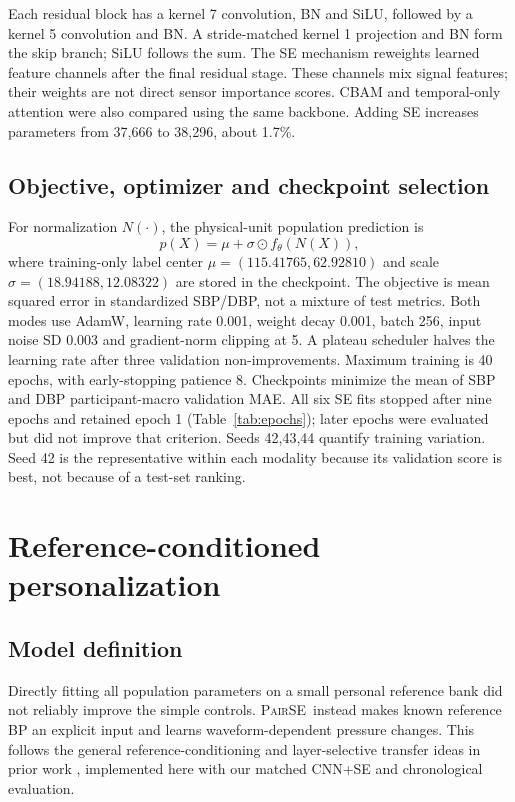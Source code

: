 \documentclass[conference]{IEEEtran}
\newcommand{\pair}{\textsc{PairSE}}
\begin{document}
Each residual block has a kernel 7 convolution, BN and SiLU, followed by a
kernel 5 convolution and BN. A stride-matched kernel 1 projection and BN form
the skip branch; SiLU follows the sum. The SE mechanism \cite{hu2018se}
reweights learned feature channels after the final residual stage. These
channels mix signal features; their weights are not direct sensor importance
scores. CBAM and temporal-only attention were also compared using the same
backbone. Adding SE increases parameters from 37,666 to 38,296, about 1.7\%.

\subsection{Objective, optimizer and checkpoint selection}
For normalization $N(\cdot)$, the physical-unit population prediction is
\begin{equation}
 p(X)=\mu+\sigma\odot f_\theta(N(X)),
\end{equation}
where training-only label center $\mu=(115.41765,62.92810)$ and scale
$\sigma=(18.94188,12.08322)$ are stored in the checkpoint. The objective is
mean squared error in standardized SBP/DBP, not a mixture of test metrics.
Both modes use AdamW, learning rate 0.001, weight decay 0.001, batch 256, input
noise SD 0.003 and gradient-norm clipping at 5. A plateau scheduler halves the
learning rate after three validation non-improvements. Maximum training is 40
epochs, with early-stopping patience 8. Checkpoints minimize the mean of SBP
and DBP participant-macro validation MAE. All six SE fits stopped after nine
epochs and retained epoch 1 (Table~\ref{tab:epochs}); later epochs were evaluated
but did not improve that criterion. Seeds 42,43,44 quantify training variation.
Seed 42 is the representative within each modality because its validation score
is best, not because of a test-set ranking.




\section{Reference-conditioned personalization}
\subsection{Model definition}
Directly fitting all population parameters on a small personal reference bank
did not reliably improve the simple controls. \pair\ instead makes known
reference BP an explicit input and learns waveform-dependent pressure changes.
This follows the general reference-conditioning and layer-selective transfer
ideas in prior work \cite{schlesinger2020,leitner2022}, implemented here with
our matched CNN+SE and chronological evaluation.
\end{document}

